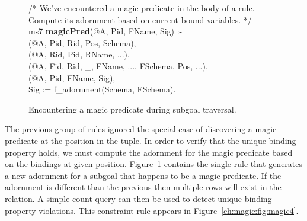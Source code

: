 \begin{figure}[!t]
\ssp
\centering
\begin{boxedminipage}{\linewidth}
/* We've encountered a magic predicate in the body of a rule. \\
   Compute its adornment based on current bound variables. */ \\
ms7 {\bf magicPred}(@A, Pid, FName, Sig) :- \\
(@A, Pid, Rid, Pos, Schema), \\
(@A, Rid, Pid, RName, ...), \\
(@A, Fid, Rid, \_, FName, ..., FSchema, Pos, ...), \\
(@A, Pid, FName, Sig), \\
\datalogspace Sig := f\_adornment(Schema, FSchema).

\end{boxedminipage}
\caption{\label{ch:magic:fig:magic3}Encountering a magic predicate during subgoal traversal.}
\end{figure}

The previous group of rules ignored the special case of discovering a magic
predicate at the position in the  tuple.  In order to verify that
the unique binding property holds, we must compute the adornment for the magic
predicate based on the bindings at given position.
Figure~\ref{ch:magic:fig:magic3} contains the single rule that generates a new
adornment for a subgoal that happens to be a magic predicate.  If the adornment
is different than the previous then multiple rows will exist in the
 relation.  A simple count query can then be used to detect
unique binding property violations.  This constraint rule appears in
Figure~\ref{ch:magic:fig:magic4}.

